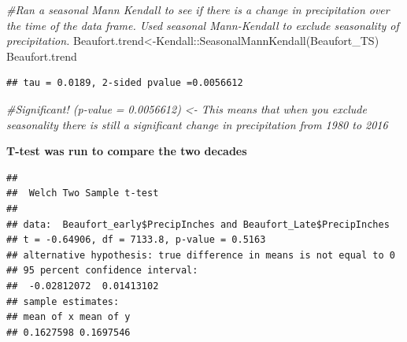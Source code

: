 \documentclass[
  12pt,
]{article}
\newenvironment{Shaded}{\begin{snugshade}}{\end{snugshade}}
\newcommand{\CommentTok}[1]{\textcolor[rgb]{0.56,0.35,0.01}{\textit{#1}}}
\newcommand{\FunctionTok}[1]{\textcolor[rgb]{0.00,0.00,0.00}{#1}}
\newcommand{\NormalTok}[1]{#1}
\newcommand{\OtherTok}[1]{\textcolor[rgb]{0.56,0.35,0.01}{#1}}
\newcommand{\SpecialCharTok}[1]{\textcolor[rgb]{0.00,0.00,0.00}{#1}}
\begin{document}
\begin{Shaded}
\begin{Highlighting}[]
\CommentTok{\#Ran a seasonal Mann Kendall to see if there is a change in precipitation over the time of the data frame. Used seasonal Mann{-}Kendall to exclude seasonality of precipitation. }
\NormalTok{Beaufort.trend}\OtherTok{\textless{}{-}}\NormalTok{Kendall}\SpecialCharTok{::}\FunctionTok{SeasonalMannKendall}\NormalTok{(Beaufort\_TS)}
\NormalTok{Beaufort.trend}
\end{Highlighting}
\end{Shaded}

\begin{verbatim}
## tau = 0.0189, 2-sided pvalue =0.0056612
\end{verbatim}

\begin{Shaded}
\begin{Highlighting}[]
\CommentTok{\#Significant! (p{-}value = 0.0056612) \textless{}{-} This means that when you exclude seasonality there is still a significant change in precipitation from 1980 to 2016}
\end{Highlighting}
\end{Shaded}

\textbf{T-test was run to compare the two decades}

\begin{Shaded}
\end{Shaded}

\begin{verbatim}
## 
##  Welch Two Sample t-test
## 
## data:  Beaufort_early$PrecipInches and Beaufort_Late$PrecipInches
## t = -0.64906, df = 7133.8, p-value = 0.5163
## alternative hypothesis: true difference in means is not equal to 0
## 95 percent confidence interval:
##  -0.02812072  0.01413102
## sample estimates:
## mean of x mean of y 
## 0.1627598 0.1697546
\end{verbatim}

\begin{Shaded}
\end{Shaded}
\end{document}
